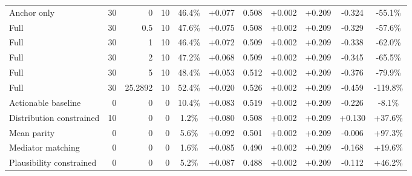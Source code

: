 \begin{table}[htbp]
\begin{tabular}{lrrrccccccc}
Anchor only & 30 & 0 & 10 & 46.4\% & +0.077 & 0.508 & +0.002 & +0.209 & -0.324 & -55.1\% \\
Full & 30 & 0.5 & 10 & 47.6\% & +0.075 & 0.508 & +0.002 & +0.209 & -0.329 & -57.6\% \\
Full & 30 & 1 & 10 & 46.4\% & +0.072 & 0.509 & +0.002 & +0.209 & -0.338 & -62.0\% \\
Full & 30 & 2 & 10 & 47.2\% & +0.068 & 0.509 & +0.002 & +0.209 & -0.345 & -65.5\% \\
Full & 30 & 5 & 10 & 48.4\% & +0.053 & 0.512 & +0.002 & +0.209 & -0.376 & -79.9\% \\
Full & 30 & 25.2892 & 10 & 52.4\% & +0.020 & 0.526 & +0.002 & +0.209 & -0.459 & -119.8\% \\
Actionable baseline & 0 & 0 & 0 & 10.4\% & +0.083 & 0.519 & +0.002 & +0.209 & -0.226 & -8.1\% \\
Distribution constrained & 10 & 0 & 0 & 1.2\% & +0.080 & 0.508 & +0.002 & +0.209 & +0.130 & +37.6\% \\
Mean parity & 0 & 0 & 0 & 5.6\% & +0.092 & 0.501 & +0.002 & +0.209 & -0.006 & +97.3\% \\
Mediator matching & 0 & 0 & 0 & 1.6\% & +0.085 & 0.490 & +0.002 & +0.209 & -0.168 & +19.6\% \\
Plausibility constrained & 0 & 0 & 0 & 5.2\% & +0.087 & 0.488 & +0.002 & +0.209 & -0.112 & +46.2\% \\
\bottomrule
\end{tabular}
\end{table}